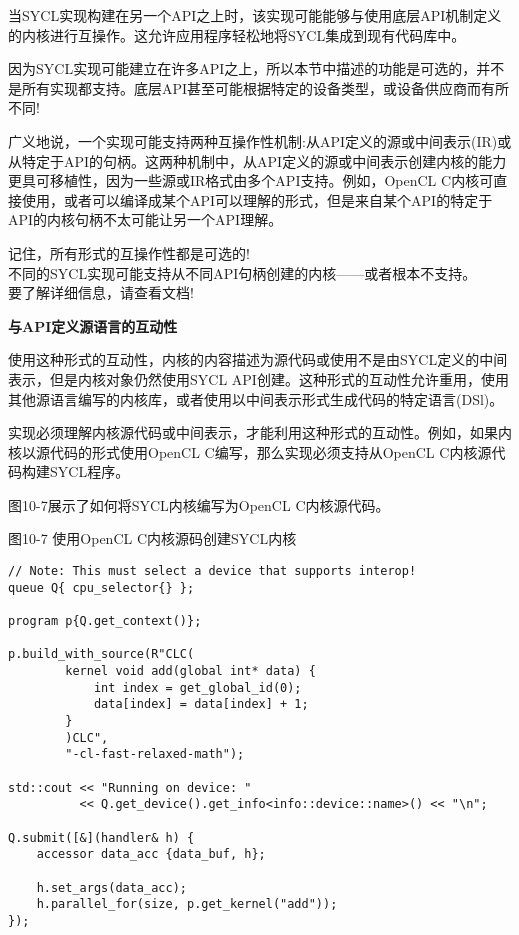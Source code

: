 当SYCL实现构建在另一个API之上时，该实现可能能够与使用底层API机制定义的内核进行互操作。这允许应用程序轻松地将SYCL集成到现有代码库中。\par

因为SYCL实现可能建立在许多API之上，所以本节中描述的功能是可选的，并不是所有实现都支持。底层API甚至可能根据特定的设备类型，或设备供应商而有所不同!\par

广义地说，一个实现可能支持两种互操作性机制:从API定义的源或中间表示(IR)或从特定于API的句柄。这两种机制中，从API定义的源或中间表示创建内核的能力更具可移植性，因为一些源或IR格式由多个API支持。例如，OpenCL C内核可直接使用，或者可以编译成某个API可以理解的形式，但是来自某个API的特定于API的内核句柄不太可能让另一个API理解。\par

\begin{tcolorbox}[colback=red!5!white,colframe=red!75!black]
记住，所有形式的互操作性都是可选的!\\
不同的SYCL实现可能支持从不同API句柄创建的内核——或者根本不支持。\\
要了解详细信息，请查看文档!
\end{tcolorbox}

\hspace*{\fill} \par %
\textbf{与API定义源语言的互动性}

使用这种形式的互动性，内核的内容描述为源代码或使用不是由SYCL定义的中间表示，但是内核对象仍然使用SYCL API创建。这种形式的互动性允许重用，使用其他源语言编写的内核库，或者使用以中间表示形式生成代码的特定语言(DSl)。\par

实现必须理解内核源代码或中间表示，才能利用这种形式的互动性。例如，如果内核以源代码的形式使用OpenCL C编写，那么实现必须支持从OpenCL C内核源代码构建SYCL程序。\par

图10-7展示了如何将SYCL内核编写为OpenCL C内核源代码。\par

\hspace*{\fill} \par %
图10-7 使用OpenCL C内核源码创建SYCL内核
\begin{lstlisting}[caption={}]
// Note: This must select a device that supports interop!
queue Q{ cpu_selector{} };

program p{Q.get_context()};

p.build_with_source(R"CLC(
		kernel void add(global int* data) {
			int index = get_global_id(0);
			data[index] = data[index] + 1;
		}
		)CLC",
		"-cl-fast-relaxed-math");
		
std::cout << "Running on device: "
		  << Q.get_device().get_info<info::device::name>() << "\n";

Q.submit([&](handler& h) {
	accessor data_acc {data_buf, h};
	
	h.set_args(data_acc);
	h.parallel_for(size, p.get_kernel("add"));
});
\end{lstlisting}

